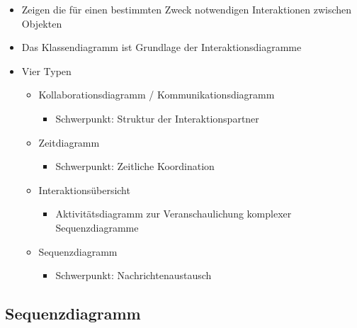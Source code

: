 \begin{itemize}
    \item Zeigen die für einen bestimmten Zweck notwendigen Interaktionen zwischen Objekten
    \item Das Klassendiagramm ist Grundlage der Interaktionsdiagramme
    \item Vier Typen
    \begin{itemize}
        \item Kollaborationsdiagramm / Kommunikationsdiagramm
        \begin{itemize}
            \item Schwerpunkt: Struktur der Interaktionspartner
        \end{itemize}
        \item Zeitdiagramm
        \begin{itemize}
            \item Schwerpunkt: Zeitliche Koordination
        \end{itemize}
        \item Interaktionsübersicht
        \begin{itemize}
            \item Aktivitätsdiagramm zur Veranschaulichung komplexer Sequenzdiagramme
        \end{itemize}
        \item Sequenzdiagramm
        \begin{itemize}
            \item Schwerpunkt: Nachrichtenaustausch
        \end{itemize}
    \end{itemize}
\end{itemize}

\subsection{Sequenzdiagramm}


